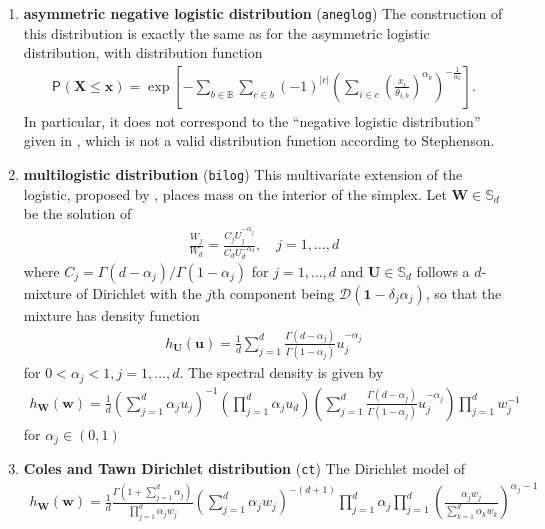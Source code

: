 \documentclass{article}
\newcommand{\bs}[1]{\boldsymbol {#1}}
\renewcommand{\P}[2][]{{\mathsf P}_{#1}\left(#2\right)}
\newcommand{\code}[1]{\texttt{#1}}
\newcommand{\pfrac}[2]{\left(\frac{#1}{#2}\right)}
\begin{document}
\begin{enumerate}
\item \textbf{asymmetric negative logistic distribution} (\code{aneglog})
The construction of this distribution is exactly the same as for the asymmetric logistic distribution, with distribution function
\begin{align*}
      \P{\bs{X} \leq \bs{x}} = \exp \left[ -\sum_{b \in \mathbb{B}}\sum_{c \in b} (-1)^{|c|}
\left(\sum_{i \in c} 
\pfrac{x_i}{\theta_{i, b}}^{\alpha_b}\right)^{-\frac{1}{\alpha_b}}\right].
\end{align*}
In particular, it does not correspond to the ``negative logistic distribution'' given in \cite{Joe:1990}, which is not a valid 
distribution function according to Stephenson. 
\item \textbf{multilogistic distribution} (\code{bilog})
This multivariate extension of the logistic, proposed by \cite{Boldi:2009}, places mass on the interior of the simplex. Let $\bs{W} \in \mathbb{S}_d$ be the solution of 
\begin{align*}
 \frac{W_j}{W_d}=\frac{C_jU_j^{-\alpha_j}}{C_dU_d^{-\alpha_d}}, \quad j=1, \ldots, d
\end{align*}
where $C_j=\Gamma(d-\alpha_j)/\Gamma(1-\alpha_j)$ for $j=1, \ldots, d$ and $\bs{U} \in \mathbb{S}_d$ follows a $d$-mixture of Dirichlet with the $j$th component being $\mathcal{D}(\bs{1}-\delta_{j}\alpha_j)$, so that the mixture has density function 
\begin{align*}
 h_{\bs{U}}(\bs{u})=\frac{1}{d} \sum_{j=1}^d \frac{\Gamma(d-\alpha_j)}{\Gamma(1-\alpha_j)} u_j^{-\alpha_j}
\end{align*}
for $0<\alpha_j <1, j=1, \ldots, d$.
The 
spectral density is given by 
\begin{align*}
   h_{\bs{W}}(\bs{w}) = \frac{1}{d} \left(\sum_{j=1}^d \alpha_ju_j\right)^{-1} \left(\prod_{j=1}^d \alpha_ju_d 
\right)\left(\sum_{j=1}^d \frac{\Gamma(d-\alpha_j)}{\Gamma(1-\alpha_j)}u_j^{-\alpha_j}\right)\prod_{j=1}^d w_j^{-1}
\end{align*}
for $\alpha_j \in (0,1)$
\item \textbf{Coles and Tawn Dirichlet distribution} (\code{ct})
The Dirichlet model of \cite{Coles:1991}
\begin{align*}
   h_{\bs{W}}(\bs{w}) = \frac{1}{d} \frac{\Gamma \left(1+\sum_{j=1}^d \alpha_j\right)}{\prod_{j=1}^d \alpha_jw_j} 
\left(\sum_{j=1}^d \alpha_jw_j\right)^{-(d+1)}\prod_{j=1}^d \alpha_j \prod_{j=1}^d \left(\frac{\alpha_jw_j}{\sum_{k=1}^d 
\alpha_kw_k}\right)^{\alpha_j-1}
\end{align*}

\end{enumerate}
\end{document}
